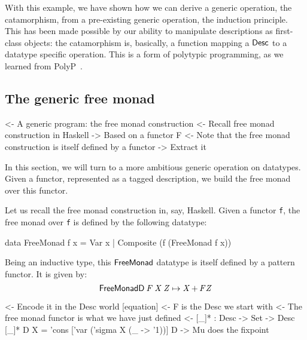 With this example, we have shown how we can derive a generic
operation, the catamorphism, from a pre-existing generic operation,
the induction principle. This has been made possible by our ability to
manipulate descriptions as first-class objects: the catamorphism is,
basically, a function mapping a $\Desc$ to a datatype specific
operation. This is a form of polytypic programming, as we learned from
PolyP~\cite{jansson:polyp}.


\subsection{The generic free monad}
\label{sec:desc-free-monad}

\begin{wstructure}
<- A generic program: the free monad construction
    <- Recall free monad construction in Haskell
        -> Based on a functor F
    <- Note that the free monad construction is itself defined by a functor
        -> Extract it
\end{wstructure}

In this section, we will turn to a more ambitious generic operation on
datatypes. Given a functor, represented as a tagged description, we
build the free monad over this functor.

\newcommand{\FMFreeMonad}{\D{FreeMonad}}
\newcommand{\FMFreeMonadD}{\D{FreeMonadD}}
\newcommand{\FMVar}{\C{Var}}
\newcommand{\FMComposite}{\C{Composite}}

Let us recall the free monad construction in, say, Haskell. Given a
functor \texttt{f}, the free monad over \texttt{f} is defined by the
following datatype:
%
\begin{code}
data FreeMonad f x
    = Var x
    | Composite (f (FreeMonad f x))
\end{code}
%
Being an inductive type, this $\FMFreeMonad$ datatype is itself
defined by a pattern functor. It is given by:
%
\[
\FMFreeMonadD\: \V{F}\: \V{X}\: \V{Z} \mapsto \V{X} \mathop{\D{+}} \V{F} \V{Z}
\]

\begin{wstructure}
    <- Encode it in the Desc world [equation]
        <- F is the Desc we start with
        <- The free monad functor is what we have just defined
        <- [\_]* : Desc -> Set -> Desc
           [\_]* D X = 'cons ['var ('sigma X (\_ -> '1))] D
        -> Mu does the fixpoint
\end{wstructure}

